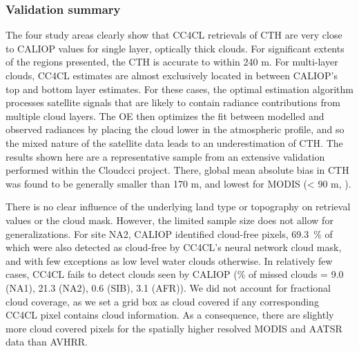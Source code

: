 \subsubsection{Validation summary}

The four study areas clearly show that CC4CL retrievals of CTH are very close to CALIOP values for single layer, optically thick clouds. For significant extents of the regions presented, the CTH is accurate to within 240 m. For multi-layer clouds, CC4CL estimates are almost exclusively located in between CALIOP's top and bottom layer estimates. For these cases, the optimal estimation algorithm processes satellite signals that are likely to contain radiance contributions from multiple cloud layers. The OE then optimizes the fit between modelled and observed radiances by placing the cloud lower in the atmospheric profile, and so the mixed nature of the satellite data leads to an underestimation of CTH. The results shown here are a representative sample from an extensive validation performed within the Cloud\textunderscore cci project. There, global mean absolute bias in CTH was found to be generally smaller than 170 m, and lowest for MODIS (< 90 m, \citet{Stengel17}).%

There is no clear influence of the underlying land type or topography on retrieval values or the cloud mask. However, the limited sample size does not allow for generalizations. For site NA2, CALIOP identified cloud-free pixels, 69.3~\% of which were also detected as cloud-free by CC4CL's neural network cloud mask, and with few exceptions as low level water clouds otherwise. In relatively few cases, CC4CL fails to detect clouds seen by CALIOP (\% of missed clouds = 9.0 (NA1), 21.3 (NA2), 0.6 (SIB), 3.1 (AFR)). We did not account for fractional cloud coverage, as we set a grid box as cloud covered if any corresponding CC4CL pixel contains cloud information. As a consequence, there are slightly more cloud covered pixels for the spatially higher resolved MODIS and AATSR data than AVHRR.

